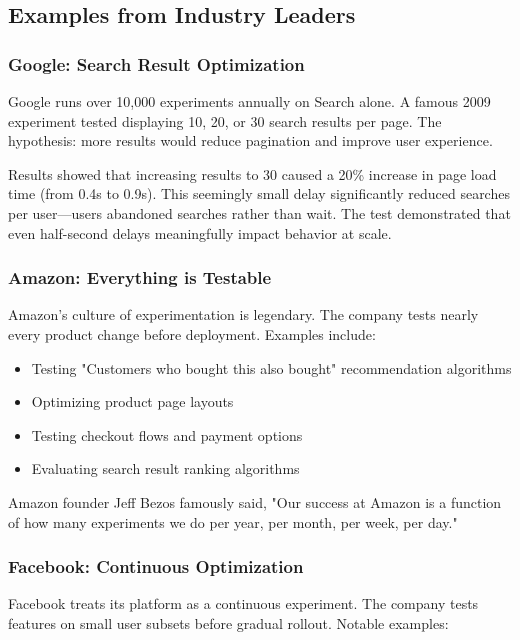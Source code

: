 \subsection{Examples from Industry Leaders}

\subsubsection{Google: Search Result Optimization}

Google runs over 10,000 experiments annually on Search alone. A famous 2009 experiment tested displaying 10, 20, or 30 search results per page. The hypothesis: more results would reduce pagination and improve user experience.

Results showed that increasing results to 30 caused a 20\% increase in page load time (from 0.4s to 0.9s). This seemingly small delay significantly reduced searches per user—users abandoned searches rather than wait. The test demonstrated that even half-second delays meaningfully impact behavior at scale.

\subsubsection{Amazon: Everything is Testable}

Amazon's culture of experimentation is legendary. The company tests nearly every product change before deployment. Examples include:

\begin{itemize}
    \item Testing "Customers who bought this also bought" recommendation algorithms
    \item Optimizing product page layouts
    \item Testing checkout flows and payment options
    \item Evaluating search result ranking algorithms
\end{itemize}

Amazon founder Jeff Bezos famously said, "Our success at Amazon is a function of how many experiments we do per year, per month, per week, per day."

\subsubsection{Facebook: Continuous Optimization}

Facebook treats its platform as a continuous experiment. The company tests features on small user subsets before gradual rollout. Notable examples:

